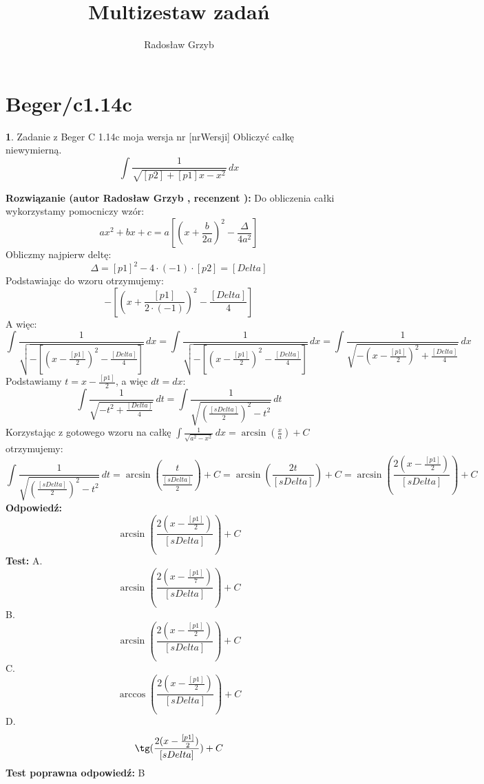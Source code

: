 \documentclass[12pt, a4paper]{article}
\title{Multizestaw zadań}
\author{Radosław Grzyb}
\date{}
\theoremstyle{definition} %
\newtheorem{zad}{}
\newcommand{\kategoria}[1]{\section{#1}} %
\newcommand{\zadStart}[1]{\begin{zad}#1\newline} %
\newcommand{\zadStop}{\end{zad}}   %
\newcommand{\rozwStart}[2]{\noindent \textbf{Rozwiązanie (autor #1 , recenzent #2): }\newline} %
\newcommand{\rozwStop}{\newline}                                            %
\newcommand{\odpStart}{\noindent \textbf{Odpowiedź:}\newline}    %
\newcommand{\odpStop}{\newline}                                             %
\newcommand{\testStart}{\noindent \textbf{Test:}\newline} %
\newcommand{\testStop}{\newline} %
\newcommand{\kluczStart}{\noindent \textbf{Test poprawna odpowiedź:}\newline} %
\newcommand{\kluczStop}{\newline} %
\begin{document}
\maketitle
\kategoria{Beger/c1.14c}
\zadStart{Zadanie z Beger C 1.14c moja wersja nr [nrWersji]}
Obliczyć całkę niewymierną.
$$\int \frac{1}{\sqrt{[p2]+[p1]x-x^{2}}} \,dx$$
\zadStop
\rozwStart{Radosław Grzyb}{}
Do obliczenia całki wykorzystamy pomocniczy wzór:
$$ax^{2}+bx+c = a[(x+\frac{b}{2a})^{2}-\frac{\Delta}{4a^{2}}]$$
Obliczmy najpierw deltę:
$$\Delta=[p1]^2-4\cdot(-1)\cdot[p2]=[Delta]$$
Podstawiając do wzoru otrzymujemy:
$$-[(x+\frac{[p1]}{2\cdot(-1)})^{2}-\frac{[Delta]}{4}]$$
A więc:
$$\int \frac{1}{\sqrt{-[(x-\frac{[p1]}{2})^{2}-\frac{[Delta]}{4}]}} \,dx=\int \frac{1}{\sqrt{-[(x-\frac{[p1]}{2})^{2}-\frac{[Delta]}{4}]}} \,dx = \int \frac{1}{\sqrt{-(x-\frac{[p1]}{2})^{2}+\frac{[Delta]}{4}}} \,dx$$
Podstawiamy $t=x-\frac{[p1]}{2}$, a więc $dt=dx$:
$$\int\frac{1}{\sqrt{-t^{2}+\frac{[Delta]}{4}}} \,dt=\int\frac{1}{\sqrt{(\frac{[sDelta]}{2})^{2}-t^{2}}} \,dt$$
Korzystając z gotowego wzoru na całkę  $\int \frac{1}{\sqrt{a^{2}-x^{2}}} \,dx = \arcsin(\frac{x}{a})+C$  otrzymujemy:
$$\int\frac{1}{\sqrt{(\frac{[sDelta]}{2})^{2}-t^{2}}} \,dt=\arcsin(\frac{t}{\frac{[sDelta]}{2}})+C=\arcsin(\frac{2t}{[sDelta]})+C=\arcsin(\frac{2(x-\frac{[p1]}{2})}{[sDelta]})+C$$
\rozwStop
\odpStart
$$\arcsin(\frac{2(x-\frac{[p1]}{2})}{[sDelta]})+C$$
\odpStop
\testStart
A.$$\arcsin(\frac{2(x-\frac{[p1]}{7})}{[sDelta]})+C$$
B.$$\arcsin(\frac{2(x-\frac{[p1]}{2})}{[sDelta]})+C$$
C.$$\arccos(\frac{2(x-\frac{[p1]}{2})}{[sDelta]})+C$$
D.$$\tg(\frac{2(x-\frac{[p1]}{2})}{[sDelta]})+C$$
\testStop
\kluczStart
B
\kluczStop
\end{document}
